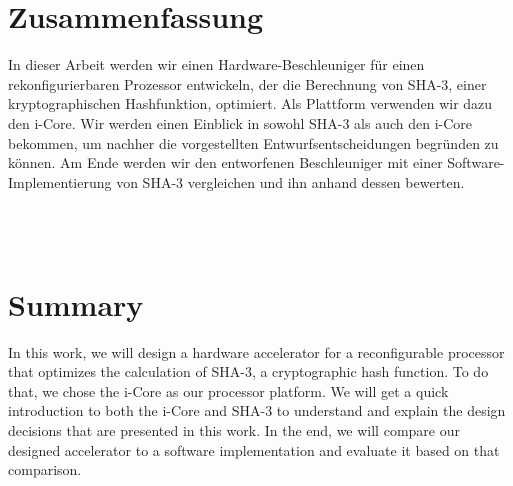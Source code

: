 

\section*{Zusammenfassung}
In dieser Arbeit werden wir einen Hardware-Beschleuniger für einen rekonfigurierbaren Prozessor entwickeln, der die Berechnung
von SHA-3, einer kryptographischen Hashfunktion, optimiert. Als Plattform verwenden wir dazu den i-Core.
Wir werden einen Einblick in sowohl SHA-3 als auch den i-Core bekommen, um nachher die vorgestellten Entwurfsentscheidungen
begründen zu können. Am Ende werden wir den entworfenen Beschleuniger mit einer Software-Implementierung von SHA-3 vergleichen
und ihn anhand dessen bewerten.


~\\
~\\
\section*{Summary}
In this work, we will design a hardware accelerator for a reconfigurable processor that optimizes the calculation of SHA-3,
a cryptographic hash function. To do that, we chose the i-Core as our processor platform. We will get a quick introduction
to both the i-Core and SHA-3 to understand and explain the design decisions that are presented in this work. In the end,
we will compare our designed accelerator to a software implementation and evaluate it based on that comparison.